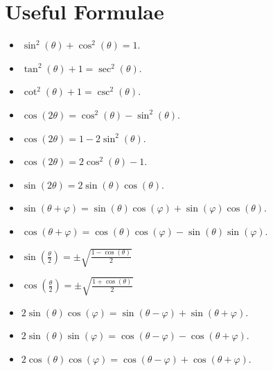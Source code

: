 \documentclass[12pt]{amsart}
\begin{document}
\newpage

\section{Useful Formulae}

\begin{itemize}
\item
  $\sin^2(\theta) + \cos^2(\theta) = 1$.
\item
  $\tan^2(\theta) + 1 = \sec^2(\theta)$.
\item
  $\cot^2(\theta) + 1 = \csc^2(\theta)$.
\item
  $\cos(2\theta) = \cos^2(\theta) - \sin^2(\theta)$.
\item
  $\cos(2\theta) = 1 - 2\sin^2(\theta)$.
\item
  $\cos(2\theta) = 2\cos^2(\theta) - 1$.
\item
  $\sin(2\theta) = 2\sin(\theta)\cos(\theta)$.
\item
  $\sin(\theta + \varphi) = \sin(\theta)\cos(\varphi) + \sin(\varphi)\cos(\theta)$.
\item
  $\cos(\theta + \varphi) = \cos(\theta)\cos(\varphi) - \sin(\theta)\sin(\varphi)$.
\item
  $\displaystyle{\sin\left(\frac{\theta}{2}\right) = \pm \sqrt{\frac{1 - \cos(\theta)}{2}}}$
\item
  $\displaystyle{\cos\left(\frac{\theta}{2}\right) = \pm \sqrt{\frac{1 + \cos(\theta)}{2}}}$
\item
  $2\sin(\theta)\cos(\varphi) = \sin(\theta - \varphi) + \sin(\theta + \varphi)$.
\item
  $2\sin(\theta)\sin(\varphi) = \cos(\theta - \varphi) - \cos(\theta + \varphi)$.
\item
  $2\cos(\theta)\cos(\varphi) = \cos(\theta - \varphi) + \cos(\theta + \varphi)$.
\end{itemize}
\end{document}
